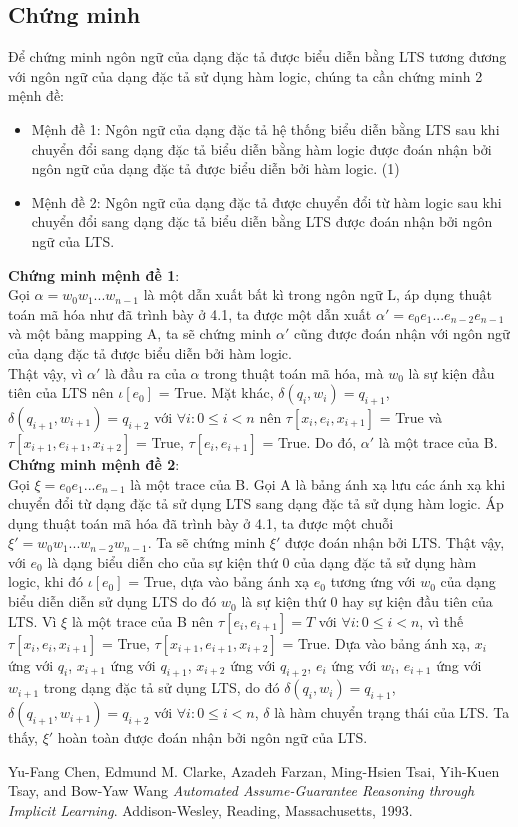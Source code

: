 \documentclass{article}
\begin{document}
\begin{flushleft}
		\section{Chứng minh}
		Để chứng minh ngôn ngữ của dạng đặc tả được biểu diễn bằng LTS tương đương với ngôn ngữ của dạng đặc tả sử dụng hàm logic, chúng ta cần chứng minh 2 mệnh đề:
		\begin{itemize}
			\item Mệnh đề 1: Ngôn ngữ của dạng đặc tả hệ thống biểu diễn bằng LTS sau khi chuyển đổi sang dạng đặc tả biểu diễn bằng hàm logic được đoán nhận bởi ngôn ngữ của dạng đặc tả được biểu diễn bởi hàm logic. (1)\\
			\item Mệnh đề 2: Ngôn ngữ của dạng đặc tả được chuyển đổi từ hàm logic sau khi chuyển đổi sang dạng đặc tả biểu diễn bằng LTS được đoán nhận bởi ngôn ngữ của LTS.
		\end{itemize}
		\textbf{Chứng minh mệnh đề 1}:\\
		Gọi $\alpha = w_0w_1...w_{n-1}$ là một dẫn xuất bất kì trong ngôn ngữ L, áp dụng thuật toán mã hóa như đã trình bày ở 4.1, ta được một dẫn xuất $\alpha' = e_0e_1...e_{n-2}e_{n-1}$ và một bảng mapping A, ta sẽ chứng minh $\alpha'$ cũng được đoán nhận với ngôn ngữ của dạng đặc tả được biểu diễn bởi hàm logic.\\
		Thật vậy, vì $\alpha'$ là đầu ra của $\alpha$ trong thuật toán mã hóa, mà $w_{0}$ là sự kiện đầu tiên của LTS nên $\iota[e_0]$ = True. Mặt khác, $\delta(q_i, w_i) = q_{i+1}$, $\delta(q_{i+1}, w_{i+1}) = q_{i+2}$ với $\forall i: 0 \leq i < n$ nên $\tau[x_i, e_i, x_{i+1}]$ = True và $\tau[x_{i+1}, e_{i+1}, x_{i+2}]$ = True, $\tau[e_i, e_{i+1}]$ = True. Do đó, $\alpha'$ là một trace của B.\\
		\textbf{Chứng minh mệnh đề 2}:\\
		Gọi $\xi = e_0e_1...e_{n-1}$ là một trace của B. Gọi A là bảng ánh xạ lưu các ánh xạ khi chuyển đổi từ dạng đặc tả sử dụng LTS sang dạng đặc tả sử dụng hàm logic. Áp dụng thuật toán mã hóa đã trình bày ở 4.1, ta được một chuỗi $\xi' = w_0w_1...w_{n-2}w_{n-1}$. Ta sẽ chứng minh $\xi'$ được đoán nhận bởi LTS. Thật vậy, với $e_0$ là dạng biểu diễn cho của sự kiện thứ 0 của dạng đặc tả sử dụng hàm logic, khi đó $\iota[e_0]$ = True, dựa vào bảng ánh xạ $e_0$ tương ứng với  $w_{0}$ của dạng biểu diễn diễn sử dụng LTS do đó $w_{0}$ là sự kiện thứ 0 hay sự kiện đầu tiên của LTS. Vì $\xi$ là một trace của B nên $\tau[e_i,e_{i+1}] = T$ với $\forall i: 0 \leq i < n$, vì thế $\tau[x_i, e_i, x_{i+1}]$ = True, $\tau[x_{i+1}, e_{i+1}, x_{i+2}]$ = True. Dựa vào bảng ánh xạ, $x_i$ ứng với $q_i$, $x_{i+1}$ ứng với $q_{i+1}$, $x_{i+2}$ ứng với $q_{i+2}$, $e_i$ ứng với $w_i$, $e_{i+1}$ ứng với $w_{i+1}$ trong dạng đặc tả sử dụng LTS, do đó $\delta(q_{i}, w_{i}) = q_{i+1}$, $\delta(q_{i+1}, w_{i+1}) = q_{i+2}$ với $\forall i: 0 \leq i < n$, $\delta$ là hàm chuyển trạng thái của LTS. Ta thấy, $\xi'$ hoàn toàn được đoán nhận bởi ngôn ngữ của LTS.
	\end{flushleft}
\begin{thebibliography}{9}
	Yu-Fang Chen, Edmund M. Clarke, Azadeh Farzan, Ming-Hsien Tsai,
	Yih-Kuen Tsay, and Bow-Yaw Wang \textit{Automated Assume-Guarantee Reasoning
		through Implicit Learning}. 
	Addison-Wesley, Reading, Massachusetts, 1993.
\end{thebibliography}
\end{document}
